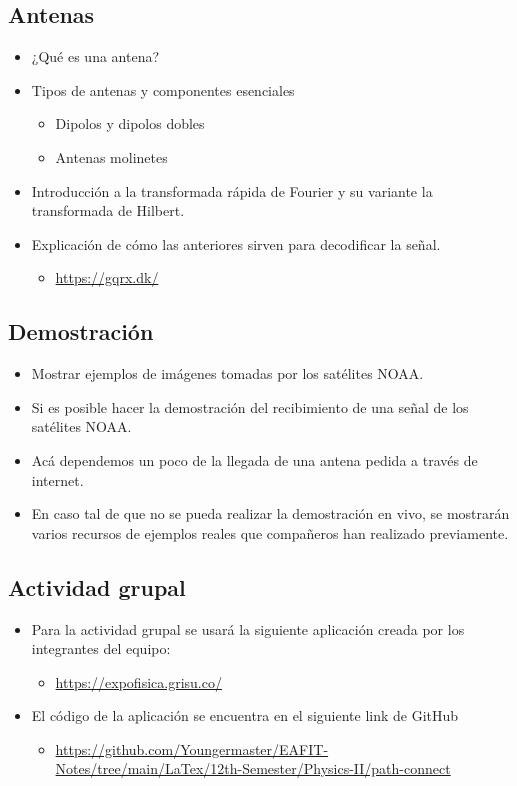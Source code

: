 \subsection{Antenas}
\begin{itemize}
    \item ¿Qué es una antena?
    \item Tipos de antenas y componentes esenciales
          \begin{itemize}
              \item Dipolos y dipolos dobles
              \item Antenas molinetes
          \end{itemize}
    \item Introducción a la transformada rápida de Fourier y su variante la transformada de Hilbert.
    \item Explicación de cómo las anteriores sirven para decodificar la señal.
          \begin{itemize}
              \item \url{https://gqrx.dk/}
          \end{itemize}
\end{itemize}

\subsection{Demostración}
\begin{itemize}
    \item Mostrar ejemplos de imágenes tomadas por los satélites NOAA.
    \item Si es posible hacer la demostración del recibimiento de una señal de los satélites NOAA.
    \item Acá dependemos un poco de la llegada de una antena pedida a través de internet.
    \item En caso tal de que no se pueda realizar la demostración en vivo, se mostrarán varios recursos de ejemplos reales que compañeros han realizado previamente.
\end{itemize}

\subsection{Actividad grupal}
\begin{itemize}
    \item Para la actividad grupal se usará la siguiente aplicación creada por los integrantes del equipo:
          \begin{itemize}
              \item \url{https://expofisica.grisu.co/}
          \end{itemize}
    \item El código de la aplicación se encuentra en el siguiente link de GitHub
          \begin{itemize}
              \item \url{https://github.com/Youngermaster/EAFIT-Notes/tree/main/LaTex/12th-Semester/Physics-II/path-connect}
          \end{itemize}

\end{itemize}

